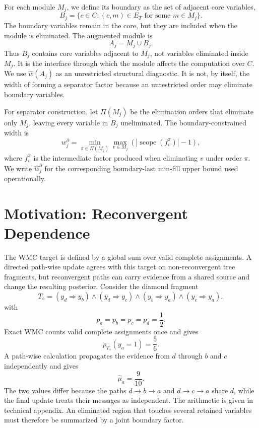 \documentclass[letterpaper]{article}
\newif\ifincludesupplement
\newcommand{\suppref}[1]{\ifincludesupplement Appendix~\csname ref\endcsname{#1}\else technical appendix\fi}
\begin{document}
For each module \(M_j\), we define its boundary as the set of adjacent
core variables,
\[
B_j
=
\{c\in C : (c,m)\in E_T \text{ for some } m\in M_j\}.
\]
The boundary variables remain in the core, but they are included when the
module is eliminated. The augmented module is
\[
A_j = M_j\cup B_j .
\]
Thus \(B_j\) contains core variables adjacent to \(M_j\), not variables
eliminated inside \(M_j\). It is the interface through which the module
affects the computation over \(C\). We use \(\widehat w(A_j)\) as an
unrestricted structural diagnostic. It is not, by itself, the width of
forming a separator factor because an unrestricted order may eliminate
boundary variables.

For separator construction, let \(\Pi(M_j)\) be the elimination orders
that eliminate only \(M_j\), leaving every variable in \(B_j\)
uneliminated. The boundary-constrained width is
\[
w_j^\partial
=
\min_{\pi\in\Pi(M_j)}
\max_{v\in M_j}
\left(
\left|\operatorname{scope}(f_v^\pi)\right|-1
\right),
\]
where \(f_v^\pi\) is the intermediate factor produced when eliminating
\(v\) under order \(\pi\). We write \(\widehat w_j^\partial\) for the
corresponding boundary-last min-fill upper bound used operationally.

\section{Motivation: Reconvergent Dependence}
\label{sec:local-reconvergence}

The WMC target is defined by a global sum over valid complete assignments.
A directed path-wise update agrees with this target on non-reconvergent
tree fragments, but reconvergent paths can carry evidence from a shared
source and change the resulting posterior.
Consider the diamond fragment
\[
T_{\diamond}
=
(y_d \Rightarrow y_b)
\wedge
(y_d \Rightarrow y_c)
\wedge
(y_b \Rightarrow y_a)
\wedge
(y_c \Rightarrow y_a),
\]
with
\[
p_a=p_b=p_c=p_d=\frac{1}{2}.
\]
Exact WMC counts valid complete assignments once and gives
\[
p_{T_{\diamond}}(y_a=1)=\frac{5}{6}.
\]
A path-wise calculation propagates the evidence from \(d\) through
\(b\) and \(c\) independently and gives
\[
\widehat{\mu}_a
=
\frac{9}{10}.
\]
The two values differ because the paths \(d\to b\to a\) and
\(d\to c\to a\) share \(d\), while the final update treats their messages
as independent. The arithmetic is given in \suppref{app:diamond-calculation}. An
eliminated region that touches several retained variables must therefore
be summarized by a joint boundary factor.
\end{document}
